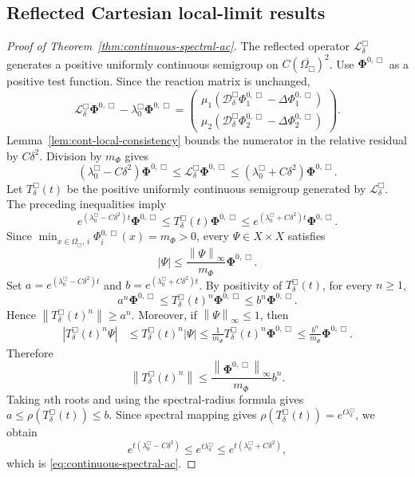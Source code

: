 \documentclass[11pt]{article}
\theoremstyle{definition}
\newcommand{\cD}{\mathcal{D}}
\newcommand{\cL}{\mathcal{L}}
\newcommand{\norm}[1]{\left\lVert #1\right\rVert}
\newcommand{\PhiV}{\bm\Phi}
\begin{document}
\subsection{Reflected Cartesian local-limit results}

\begin{proof}[Proof of Theorem~\ref{thm:continuous-spectral-ac}]
The reflected operator $\cL_\delta^{\Box}$ generates a positive uniformly continuous semigroup on $C(\overline{\Omega_{\Box}})^2$.  Use $\PhiV^{0,\Box}$ as a positive test function.  Since the reaction matrix is unchanged,
\[
 \cL_\delta^{\Box}\PhiV^{0,\Box}
 -\lambda_0^{\Box}\PhiV^{0,\Box}
 =
 \begin{pmatrix}
 \mu_1(\cD_\delta^{\Box}\Phi_1^{0,\Box}
       -\Delta\Phi_1^{0,\Box})\\
 \mu_2(\cD_\delta^{\Box}\Phi_2^{0,\Box}
       -\Delta\Phi_2^{0,\Box})
 \end{pmatrix}.
\]
Lemma~\ref{lem:cont-local-consistency} bounds the numerator in the relative residual by $C\delta^2$.  Division by $m_\Phi$ gives
\[
 (\lambda_0^{\Box}-C\delta^2)\PhiV^{0,\Box}
 \le
 \cL_\delta^{\Box}\PhiV^{0,\Box}
 \le
 (\lambda_0^{\Box}+C\delta^2)\PhiV^{0,\Box}.
\]
Let $T_\delta^{\Box}(t)$ be the positive uniformly continuous semigroup generated by $\cL_\delta^{\Box}$.  The preceding inequalities imply
\[
 e^{(\lambda_0^{\Box}-C\delta^2)t}\PhiV^{0,\Box}
 \le
 T_\delta^{\Box}(t)\PhiV^{0,\Box}
 \le
 e^{(\lambda_0^{\Box}+C\delta^2)t}\PhiV^{0,\Box}.
\]
Since $\min_{x\in\overline{\Omega_\Box},\,i}\Phi_i^{0,\Box}(x)=m_\Phi>0$, every $\Psi\in X\times X$ satisfies
\[
 |\Psi|
 \le
 \frac{\norm{\Psi}_\infty}{m_\Phi}\PhiV^{0,\Box}.
\]
Set $a=e^{(\lambda_0^{\Box}-C\delta^2)t}$ and $b=e^{(\lambda_0^{\Box}+C\delta^2)t}$.  By positivity of $T_\delta^{\Box}(t)$, for every $n\ge1$,
\[
 a^n\PhiV^{0,\Box}
 \le
 T_\delta^{\Box}(t)^n\PhiV^{0,\Box}
 \le
 b^n\PhiV^{0,\Box}.
\]
Hence $\norm{T_\delta^{\Box}(t)^n}\ge a^n$.  Moreover, if $\norm{\Psi}_\infty\le1$, then
\[
 \begin{aligned}
 |T_\delta^{\Box}(t)^n\Psi|
 &\le
 T_\delta^{\Box}(t)^n|\Psi|\le
 \frac{1}{m_\Phi}
 T_\delta^{\Box}(t)^n\PhiV^{0,\Box}\le
 \frac{b^n}{m_\Phi}\PhiV^{0,\Box}.
 \end{aligned}
\]
Therefore
\[
 \norm{T_\delta^{\Box}(t)^n}
 \le
 \frac{\norm{\PhiV^{0,\Box}}_\infty}{m_\Phi}b^n.
\]
Taking $n$th roots and using the spectral-radius formula gives $a\le\rho(T_\delta^{\Box}(t))\le b$.  Since spectral mapping gives $\rho(T_\delta^{\Box}(t))=e^{t\lambda_\delta^{\Box}}$, we obtain
\[
 e^{t(\lambda_0^{\Box}-C\delta^2)}
 \le
 e^{t\lambda_\delta^{\Box}}
 \le
 e^{t(\lambda_0^{\Box}+C\delta^2)},
\]
which is \eqref{eq:continuous-spectral-ac}.
\end{proof}
\end{document}
